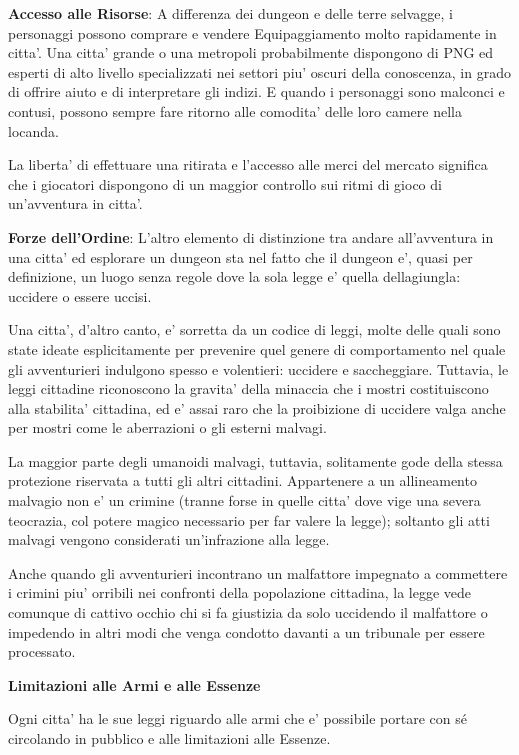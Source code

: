 \documentclass[a4paper,11pt,twoside,openany]{dndbook}
\begin{document}
{\textbf{Accesso alle Risorse}: A differenza dei dungeon e delle terre selvagge, i personaggi possono comprare e vendere Equipaggiamento molto rapidamente in citta'. Una citta' grande o una metropoli probabilmente dispongono di PNG ed esperti di alto livello specializzati nei settori piu' oscuri della conoscenza, in grado di offrire aiuto e di interpretare gli indizi. E quando i personaggi sono malconci e contusi, possono sempre fare ritorno alle comodita' delle loro camere nella locanda.

La liberta' di effettuare una ritirata e l'accesso alle merci del mercato significa che i giocatori dispongono di un maggior controllo sui ritmi di gioco di un'avventura in citta'.

\textbf{Forze dell'Ordine}: L'altro elemento di distinzione tra andare all'avventura in una citta' ed esplorare un dungeon sta nel fatto che il dungeon e', quasi per definizione, un luogo senza regole dove la sola legge e' quella dellagiungla: uccidere o essere uccisi.

Una citta', d'altro canto, e' sorretta da un codice di leggi, molte delle quali sono state ideate esplicitamente per prevenire quel genere di comportamento nel quale gli avventurieri indulgono spesso e volentieri: uccidere e saccheggiare. Tuttavia, le leggi cittadine riconoscono la gravita' della minaccia che i mostri costituiscono alla stabilita' cittadina, ed e' assai raro che la proibizione di uccidere valga anche per mostri come le aberrazioni o gli esterni malvagi.

La maggior parte degli umanoidi malvagi, tuttavia, solitamente gode della stessa protezione riservata a tutti gli altri cittadini. Appartenere a un allineamento malvagio non e' un crimine (tranne forse in quelle citta' dove vige una severa teocrazia, col potere magico necessario per far valere la legge); soltanto gli atti malvagi vengono considerati un'infrazione alla legge. 

Anche quando gli avventurieri incontrano un malfattore impegnato a commettere i crimini piu' orribili nei confronti della popolazione cittadina, la legge vede comunque di cattivo occhio chi si fa giustizia da solo uccidendo il malfattore o impedendo in altri modi che venga condotto davanti a un tribunale per essere processato.

\textbf{Limitazioni alle Armi e alle Essenze}

Ogni citta' ha le sue leggi riguardo alle armi che e' possibile portare con sé circolando in pubblico e alle limitazioni alle Essenze.

}
\end{document}
